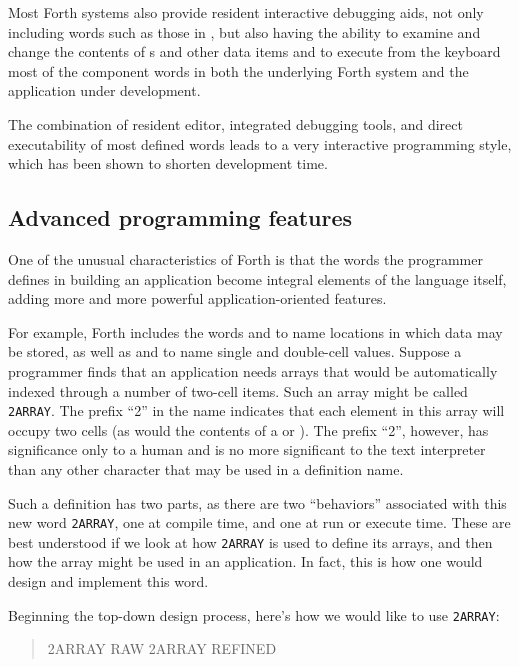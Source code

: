Most Forth systems also provide resident interactive debugging aids,
not only including words such as those in , but also having the ability
to examine and change the contents of s and other
data items and to execute from the keyboard most of the component
words in both the underlying Forth system and the application under
development.

The combination of resident editor, integrated debugging tools, and
direct executability of most defined words leads to a very interactive
programming style, which has been shown to shorten development time.

\subsection{Advanced programming features} %

One of the unusual characteristics of Forth is that the words the
programmer defines in building an application become integral elements
of the language itself, adding more and more powerful
application-oriented features.

For example, Forth includes the words  and
 to name locations in which data may be
stored, as well as  and 
to name single and double-cell values. Suppose a programmer finds that
an application needs arrays that would be automatically indexed
through a number of two-cell items. Such an array might be called
\texttt{2ARRAY}. The prefix ``2'' in the name indicates that each
element in this array will occupy two cells (as would the contents
of a  or ). The prefix
``2'', however, has significance only to a human and is no more
significant to the text interpreter than any other character that
may be used in a definition name.

Such a definition has two parts, as there are two ``behaviors''
associated with this new word \texttt{2ARRAY}, one at compile time,
and one at run or execute time. These are best understood if we look
at how \texttt{2ARRAY} is used to define its arrays, and then how the
array might be used in an application. In fact, this is how one would
design and implement this word.

Beginning the top-down design process, here's how we would like to
use \texttt{2ARRAY}:

\begin{quote} 2ARRAY RAW  2ARRAY REFINED
\end{quote}

